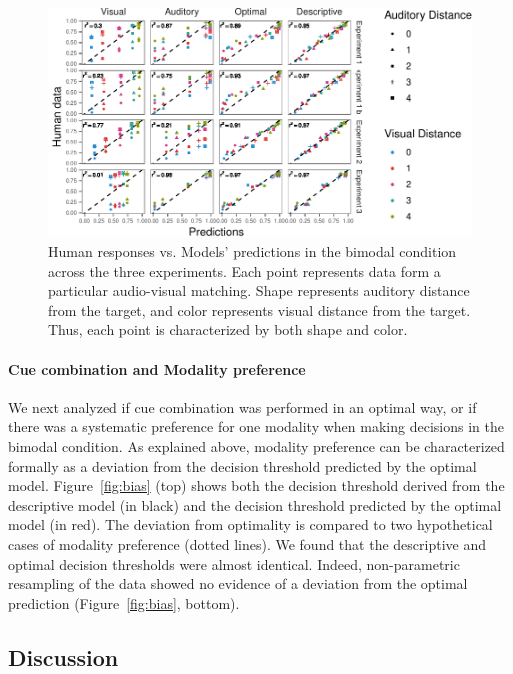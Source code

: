 \documentclass[english,,man,floatsintext]{apa6}
\let\oldparagraph\paragraph
\renewcommand{\paragraph}[1]{\oldparagraph{#1}\mbox{}}
\theoremstyle{definition}
\theoremstyle{definition}
\theoremstyle{definition}
\theoremstyle{remark}
\begin{document}
\begin{figure}[!h]
\includegraphics[width=\textwidth]{ms_files/figure-latex/bimodal-1} \caption{Human responses vs. Models' predictions in the bimodal condition across the three experiments. Each point represents data form a particular audio-visual matching. Shape represents auditory distance from the target, and color represents visual distance from the target. Thus, each point is characterized by both  shape and color.}\label{fig:bimodal}
\end{figure}

\paragraph{Cue combination and Modality
preference}\label{cue-combination-and-modality-preference}

We next analyzed if cue combination was performed in an optimal way, or
if there was a systematic preference for one modality when making
decisions in the bimodal condition. As explained above, modality
preference can be characterized formally as a deviation from the
decision threshold predicted by the optimal model. Figure~\ref{fig:bias}
(top) shows both the decision threshold derived from the descriptive
model (in black) and the decision threshold predicted by the optimal
model (in red). The deviation from optimality is compared to two
hypothetical cases of modality preference (dotted lines). We found that
the descriptive and optimal decision thresholds were almost identical.
Indeed, non-parametric resampling of the data showed no evidence of a
deviation from the optimal prediction (Figure~\ref{fig:bias}, bottom).

\subsection{Discussion}\label{discussion}
\end{document}
